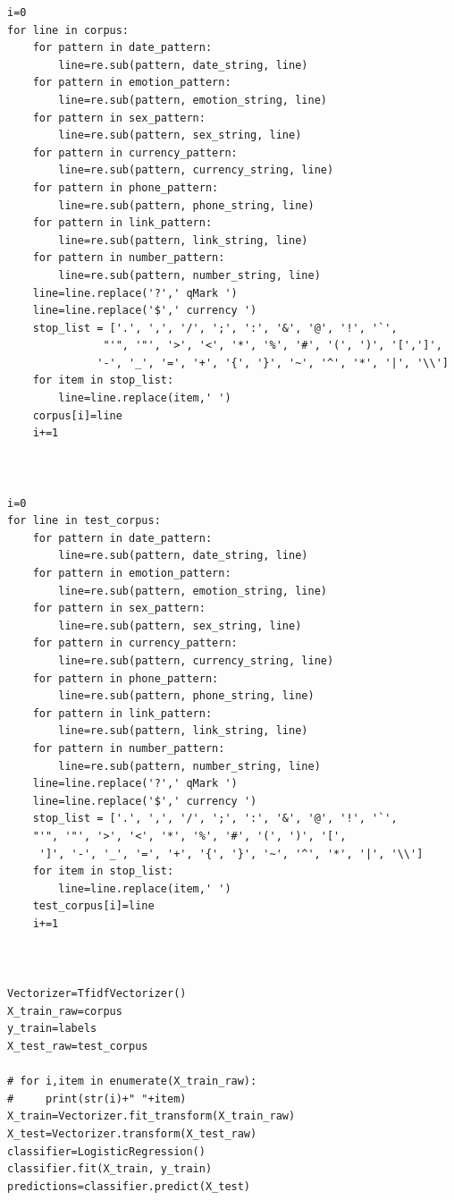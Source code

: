 \documentclass[a4paper,11pt]{report}
\begin{document}
\begin{lstlisting}
i=0
for line in corpus:
    for pattern in date_pattern:
        line=re.sub(pattern, date_string, line)
    for pattern in emotion_pattern:
        line=re.sub(pattern, emotion_string, line)
    for pattern in sex_pattern:
        line=re.sub(pattern, sex_string, line)    
    for pattern in currency_pattern:
        line=re.sub(pattern, currency_string, line)
    for pattern in phone_pattern:
        line=re.sub(pattern, phone_string, line)
    for pattern in link_pattern:
        line=re.sub(pattern, link_string, line)
    for pattern in number_pattern:
        line=re.sub(pattern, number_string, line)
    line=line.replace('?',' qMark ')
    line=line.replace('$',' currency ')
    stop_list = ['.', ',', '/', ';', ':', '&', '@', '!', '`',
               "'", '"', '>', '<', '*', '%', '#', '(', ')', '[',']',
              '-', '_', '=', '+', '{', '}', '~', '^', '*', '|', '\\']
    for item in stop_list:
        line=line.replace(item,' ')
    corpus[i]=line
    i+=1



i=0
for line in test_corpus:
    for pattern in date_pattern:
        line=re.sub(pattern, date_string, line)
    for pattern in emotion_pattern:
        line=re.sub(pattern, emotion_string, line)
    for pattern in sex_pattern:
        line=re.sub(pattern, sex_string, line)
    for pattern in currency_pattern:
        line=re.sub(pattern, currency_string, line)
    for pattern in phone_pattern:
        line=re.sub(pattern, phone_string, line)
    for pattern in link_pattern:
        line=re.sub(pattern, link_string, line)
    for pattern in number_pattern:
        line=re.sub(pattern, number_string, line)
    line=line.replace('?',' qMark ')
    line=line.replace('$',' currency ')
    stop_list = ['.', ',', '/', ';', ':', '&', '@', '!', '`',
    "'", '"', '>', '<', '*', '%', '#', '(', ')', '[',
     ']', '-', '_', '=', '+', '{', '}', '~', '^', '*', '|', '\\']
    for item in stop_list:
        line=line.replace(item,' ')
    test_corpus[i]=line
    i+=1



Vectorizer=TfidfVectorizer()
X_train_raw=corpus
y_train=labels
X_test_raw=test_corpus

# for i,item in enumerate(X_train_raw):
#     print(str(i)+" "+item)
X_train=Vectorizer.fit_transform(X_train_raw)
X_test=Vectorizer.transform(X_test_raw)
classifier=LogisticRegression()
classifier.fit(X_train, y_train)
predictions=classifier.predict(X_test)


\end{lstlisting}
\end{document}
